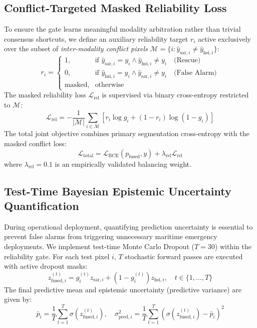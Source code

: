 \documentclass[conference]{IEEEtran}
\begin{document}
\subsection{Conflict-Targeted Masked Reliability Loss}
To ensure the gate learns meaningful modality arbitration rather than trivial consensus shortcuts, we define an auxiliary reliability target $r_i$ active exclusively over the subset of \textit{inter-modality conflict pixels} $\mathcal{M} = \{i : \hat{y}_{\text{sar}, i} \neq \hat{y}_{\text{hsi}, i}\}$:
\begin{equation}
\label{eq:reliability_target}
r_i = \begin{cases}
1, & \text{if } \hat{y}_{\text{sar}, i} = y_i \land \hat{y}_{\text{hsi}, i} \neq y_i \quad \text{(Rescue)} \\
0, & \text{if } \hat{y}_{\text{hsi}, i} = y_i \land \hat{y}_{\text{sar}, i} \neq y_i \quad \text{(False Alarm)} \\
\text{masked}, & \text{otherwise}
\end{cases}
\end{equation}
The masked reliability loss $\mathcal{L}_{\text{rel}}$ is supervised via binary cross-entropy restricted to $\mathcal{M}$:
\begin{equation}
\mathcal{L}_{\text{rel}} = -\frac{1}{|\mathcal{M}|} \sum_{i \in \mathcal{M}} \left[ r_i \log g_i + (1 - r_i) \log(1 - g_i) \right]
\end{equation}
The total joint objective combines primary segmentation cross-entropy with the masked conflict loss:
\begin{equation}
\mathcal{L}_{\text{total}} = \mathcal{L}_{\text{BCE}}(p_{\text{fused}}, y) + \lambda_{\text{rel}} \mathcal{L}_{\text{rel}}
\end{equation}
where $\lambda_{\text{rel}} = 0.1$ is an empirically validated balancing weight.

\subsection{Test-Time Bayesian Epistemic Uncertainty Quantification}
During operational deployment, quantifying prediction uncertainty is essential to prevent false alarms from triggering unnecessary maritime emergency deployments. We implement test-time Monte Carlo Dropout ($T=30$) within the reliability gate. For each test pixel $i$, $T$ stochastic forward passes are executed with active dropout masks:
\begin{equation}
z_{\text{fused}, i}^{(t)} = g_i^{(t)} z_{\text{sar}, i} + (1 - g_i^{(t)}) z_{\text{hsi}, i}, \quad t \in \{1, \dots, T\}
\end{equation}
The final predictive mean and epistemic uncertainty (predictive variance) are given by:
\begin{equation}
\bar{p}_i = \frac{1}{T} \sum_{t=1}^T \sigma(z_{\text{fused}, i}^{(t)}), \quad \sigma^2_{\text{pred}, i} = \frac{1}{T} \sum_{t=1}^T \left( \sigma(z_{\text{fused}, i}^{(t)}) - \bar{p}_i \right)^2
\end{equation}
\end{document}
